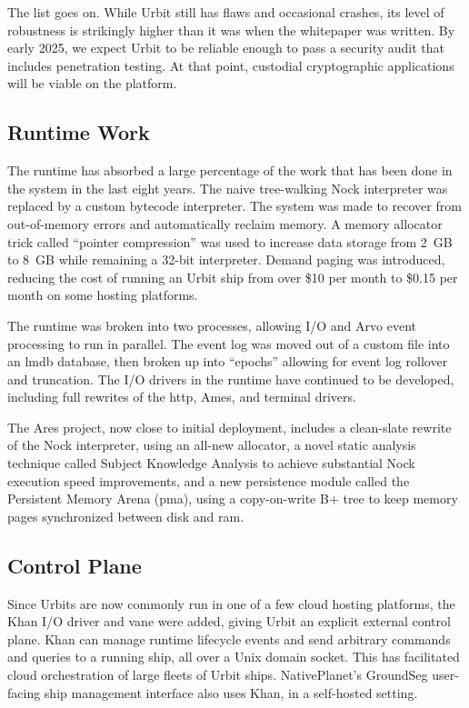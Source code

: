 \documentclass[twoside]{article}
\begin{document}
The list goes on.  While Urbit still has flaws and occasional crashes, its level of robustness is strikingly higher than it was when the whitepaper was written.  By early 2025, we expect Urbit to be reliable enough to pass a security audit that includes penetration testing.  At that point, custodial cryptographic applications will be viable on the platform.

\subsection{Runtime Work}

The runtime has absorbed a large percentage of the work that has been done in the system in the last eight years.  The naive tree-walking Nock interpreter was replaced by a custom bytecode interpreter.  The system was made to recover from out-of-memory errors and automatically reclaim memory.  A memory allocator trick called ``pointer compression'' was used to increase data storage from 2~GB to 8~GB while remaining a 32-bit interpreter.  Demand paging was introduced, reducing the cost of running an Urbit ship from over \$10 per month to \$0.15 per month on some hosting platforms.

The runtime was broken into two processes, allowing I/O and Arvo event processing to run in parallel.  The event log was moved out of a custom file into an {\sc lmdb} database, then broken up into ``epochs'' allowing for event log rollover and truncation.  The I/O drivers in the runtime have continued to be developed, including full rewrites of the {\sc http}, Ames, and terminal drivers.  

The Ares project, now close to initial deployment, includes a clean-slate rewrite of the Nock interpreter, using an all-new allocator, a novel static analysis technique called Subject Knowledge Analysis to achieve substantial Nock execution speed improvements, and a new persistence module called the Persistent Memory Arena ({\sc pma}), using a copy-on-write B+ tree to keep memory pages synchronized between disk and {\sc ram}.

\subsection{Control Plane}

Since Urbits are now commonly run in one of a few cloud hosting platforms, the Khan I/O driver and vane were added, giving Urbit an explicit external control plane.  Khan can manage runtime lifecycle events and send arbitrary commands and queries to a running ship, all over a Unix domain socket.  This has facilitated cloud orchestration of large fleets of Urbit ships.  NativePlanet's GroundSeg user-facing ship management interface \citep{GroundSeg} also uses Khan, in a self-hosted setting.
\end{document}
